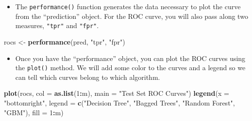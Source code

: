 \documentclass[
]{book}
\newenvironment{Shaded}{\begin{snugshade}}{\end{snugshade}}
\newcommand{\CommentTok}[1]{\textcolor[rgb]{0.56,0.35,0.01}{\textit{#1}}}
\newcommand{\DataTypeTok}[1]{\textcolor[rgb]{0.13,0.29,0.53}{#1}}
\newcommand{\DecValTok}[1]{\textcolor[rgb]{0.00,0.00,0.81}{#1}}
\newcommand{\KeywordTok}[1]{\textcolor[rgb]{0.13,0.29,0.53}{\textbf{#1}}}
\newcommand{\NormalTok}[1]{#1}
\newcommand{\OperatorTok}[1]{\textcolor[rgb]{0.81,0.36,0.00}{\textbf{#1}}}
\newcommand{\StringTok}[1]{\textcolor[rgb]{0.31,0.60,0.02}{#1}}
\providecommand{\tightlist}{%
  \setlength{\itemsep}{0pt}\setlength{\parskip}{0pt}}
\begin{document}
\begin{Shaded}
\end{Shaded}

\begin{itemize}
\tightlist
\item
  The \texttt{performance()} function generates the data necessary to plot the curve from the ``prediction'' object. For the ROC curve, you will also pass along two measures, \texttt{"tpr"} and \texttt{"fpr"}.
\end{itemize}

\begin{Shaded}
\begin{Highlighting}[]
\NormalTok{rocs <-}\StringTok{ }\KeywordTok{performance}\NormalTok{(pred, }\StringTok{"tpr"}\NormalTok{, }\StringTok{"fpr"}\NormalTok{)}
\end{Highlighting}
\end{Shaded}

\begin{itemize}
\tightlist
\item
  Once you have the ``performance'' object, you can plot the ROC curves using the \texttt{plot()} method. We will add some color to the curves and a legend so we can tell which curves belong to which algorithm.
\end{itemize}

\begin{Shaded}
\begin{Highlighting}[]
\KeywordTok{plot}\NormalTok{(rocs, }\DataTypeTok{col =} \KeywordTok{as.list}\NormalTok{(}\DecValTok{1}\OperatorTok{:}\NormalTok{m), }\DataTypeTok{main =} \StringTok{"Test Set ROC Curves"}\NormalTok{)}
\KeywordTok{legend}\NormalTok{(}\DataTypeTok{x =} \StringTok{"bottomright"}\NormalTok{, }
       \DataTypeTok{legend =} \KeywordTok{c}\NormalTok{(}\StringTok{"Decision Tree"}\NormalTok{, }\StringTok{"Bagged Trees"}\NormalTok{, }\StringTok{"Random Forest"}\NormalTok{, }\StringTok{"GBM"}\NormalTok{),}
       \DataTypeTok{fill =} \DecValTok{1}\OperatorTok{:}\NormalTok{m)}
\end{Highlighting}
\end{Shaded}

  
\end{document}
